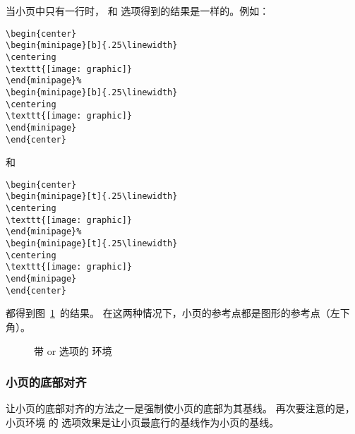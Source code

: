 当小页中只有一行时， \opt{[b]} 和 \opt{[t]} 选项得到的结果是一样的。例如：
\begin{lstlisting}
\begin{center}
\begin{minipage}[b]{.25\linewidth}
\centering
\texttt{[image: graphic]}
\end{minipage}%
\begin{minipage}[b]{.25\linewidth}
\centering
\texttt{[image: graphic]}
\end{minipage}
\end{center}
\end{lstlisting}
和
\begin{lstlisting}
\begin{center}
\begin{minipage}[t]{.25\linewidth}
\centering
\texttt{[image: graphic]}
\end{minipage}%
\begin{minipage}[t]{.25\linewidth}
\centering
\texttt{[image: graphic]}
\end{minipage}
\end{center}
\end{lstlisting}
都得到图~\ref{fig:minipagesamp-1}~的结果。
在这两种情况下，小页的参考点都是图形的参考点（左下角）。
\begin{figure}
\begin{center}
	\begin{minipage}[t]{.25\linewidth}
		\centering
		\resizebox{1in}{!}{\usebox{\boxgraphic}}
	\end{minipage}%
	\begin{minipage}[t]{.25\linewidth}
		\centering
	\end{minipage}
\end{center}
\caption{带 \opt{[b]} or \opt{[t]} 选项的  环境}
\label{fig:minipagesamp-1}
\end{figure}

\subsubsection{小页的底部对齐}
让小页的底部对齐的方法之一是强制使小页的底部为其基线。
再次要注意的是，小页环境  的 \opt{[b]} 选项效果是让小页最底行的基线作为小页的基线。

